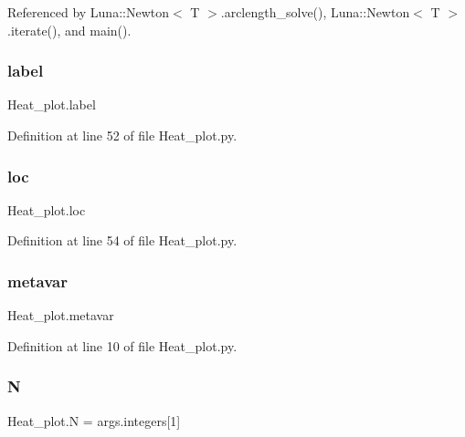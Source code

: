 Referenced by Luna\+::\+Newton$<$ T $>$.\+arclength\+\_\+solve(), Luna\+::\+Newton$<$ T $>$.\+iterate(), and main().

\mbox{\label{namespaceHeat__plot_abfde0ea5b1da0c081d5643f0bce5aa3c}} 
\subsubsection{\texorpdfstring{label}{label}}
{\footnotesize\ttfamily Heat\+\_\+plot.\+label}



Definition at line 52 of file Heat\+\_\+plot.\+py.

\mbox{\label{namespaceHeat__plot_aa109fec5bb7f2e730396a2cb623b2ad2}} 
\subsubsection{\texorpdfstring{loc}{loc}}
{\footnotesize\ttfamily Heat\+\_\+plot.\+loc}



Definition at line 54 of file Heat\+\_\+plot.\+py.

\mbox{\label{namespaceHeat__plot_aa83cfaa0b72d1fc27839aca50eaf9b68}} 
\subsubsection{\texorpdfstring{metavar}{metavar}}
{\footnotesize\ttfamily Heat\+\_\+plot.\+metavar}



Definition at line 10 of file Heat\+\_\+plot.\+py.

\mbox{\label{namespaceHeat__plot_a7d050092798e28458a263710837bda77}} 
\subsubsection{\texorpdfstring{N}{N}}
{\footnotesize\ttfamily Heat\+\_\+plot.\+N = args.\+integers\mbox{[}1\mbox{]}}



